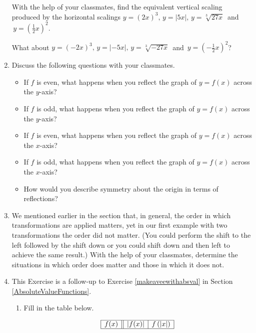 \begin{enumerate}
With the help of your classmates, find the equivalent vertical scaling produced by the horizontal scalings $y = (2x)^{3}, \, y = |5x|, \, y = \sqrt[3]{27x} \, $ and $\, y = \left(\frac{1}{2} x\right)^{2}$.  

What about $y = (-2x)^{3}, \, y = |-5x|, \, y = \sqrt[3]{-27x}\, $ and $\, y = \left(-\frac{1}{2} x\right)^{2}$?

\newpage

\item   \label{SymmetryandReflectionsExercise}  Discuss the following questions with your classmates.

\begin{itemize}
\item If $f$ is even, what happens when you reflect the graph of $y = f(x)$ across the $y$-axis? 
\item If $f$ is odd, what happens when you reflect the graph of $y = f(x)$ across the $y$-axis? 
\item  If $f$ is even, what happens when you reflect the graph of $y = f(x)$ across the $x$-axis? 
\item  If $f$ is odd, what happens when you reflect the graph of $y = f(x)$ across the $x$-axis?  
\item How would you describe symmetry about the origin in terms of reflections?
\end{itemize}

\item  We mentioned earlier in the section that, in general, the order in which transformations are applied matters, yet in our first example with two transformations the order did not matter. (You could perform the shift to the left followed by the shift down or you could shift down and then left to achieve the same result.)  With the help of your classmates, determine the situations in which order does matter and those in which it does not.

\item \label{relatedbyabsexercise}  This Exercise is a follow-up to Exercise \ref{makeaveewithabsval} in Section \ref{AbsoluteValueFunctions}.

\begin{enumerate}

\item  Fill in the table below.

\[ \begin{array}{|c||c|c|}

\hline

f(x) & |f(x)| & f\left(|x| \right)  \\ \hline


\end{array}\]
\end{enumerate}
\end{enumerate}
